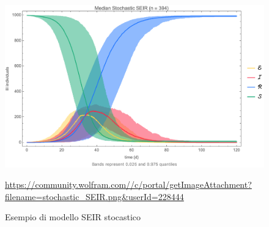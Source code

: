 \begin{figure}[H]
    \begin{center}
        \includegraphics[width=\textwidth]{img/stochastic_SEIR.png}
        \caption{Esempio di modello SEIR stocastico}
        \url{https://community.wolfram.com//c/portal/getImageAttachment?filename=stochastic_SEIR.png&userId=228444}
        \label{fig:stochastic_SEIR_model}
    \end{center}
\end{figure}